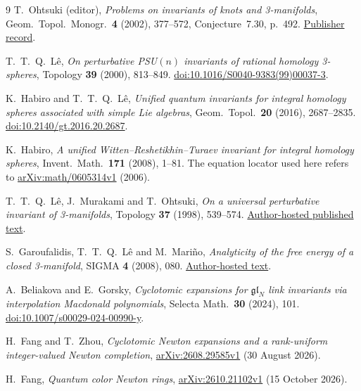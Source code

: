 \documentclass[11pt]{article}
\begin{document}
\begin{thebibliography}{9}
T.~Ohtsuki (editor), \emph{Problems on invariants of knots and
3-manifolds}, Geom.\ Topol.\ Monogr.\ \textbf{4} (2002), 377--572,
Conjecture~7.30, p.~492.
\href{https://msp.org/gtm/2002/04/p024.xhtml}{Publisher record}.

T.~T.~Q.~L\^e, \emph{On perturbative PSU$(n)$ invariants of rational
homology 3-spheres}, Topology \textbf{39} (2000), 813--849.
\href{https://doi.org/10.1016/S0040-9383(99)00037-3}{doi:10.1016/S0040-9383(99)00037-3}.

K.~Habiro and T.~T.~Q.~L\^e, \emph{Unified quantum invariants for integral
homology spheres associated with simple Lie algebras},
Geom.\ Topol.\ \textbf{20} (2016), 2687--2835.
\href{https://doi.org/10.2140/gt.2016.20.2687}{doi:10.2140/gt.2016.20.2687}.

K.~Habiro, \emph{A unified Witten--Reshetikhin--Turaev invariant for
integral homology spheres}, Invent.\ Math.\ \textbf{171} (2008), 1--81.
The equation locator used here refers to
\href{https://arxiv.org/abs/math/0605314v1}{arXiv:math/0605314v1} (2006).

T.~T.~Q.~L\^e, J.~Murakami and T.~Ohtsuki,
\emph{On a universal perturbative invariant of 3-manifolds},
Topology \textbf{37} (1998), 539--574.
\href{https://letu.math.gatech.edu/Papers/LMO.pdf}{Author-hosted published text}.

S.~Garoufalidis, T.~T.~Q.~L\^e and M.~Mari\~no,
\emph{Analyticity of the free energy of a closed 3-manifold},
SIGMA \textbf{4} (2008), 080.
\href{https://letu.math.gatech.edu/Papers/Free_Energy.pdf}{Author-hosted text}.

A.~Beliakova and E.~Gorsky,
\emph{Cyclotomic expansions for $\mathfrak{gl}_N$ link invariants via
interpolation Macdonald polynomials}, Selecta Math.\ \textbf{30}
(2024), 101.
\href{https://doi.org/10.1007/s00029-024-00990-y}{doi:10.1007/s00029-024-00990-y}.

H.~Fang and T.~Zhou, \emph{Cyclotomic Newton expansions and a
rank-uniform integer-valued Newton completion},
\href{https://arxiv.org/abs/2608.29585v1}{arXiv:2608.29585v1}
(30 August 2026).

H.~Fang, \emph{Quantum color Newton rings},
\href{https://arxiv.org/abs/2610.21102v1}{arXiv:2610.21102v1}
(15 October 2026).
\end{thebibliography}
\end{document}
